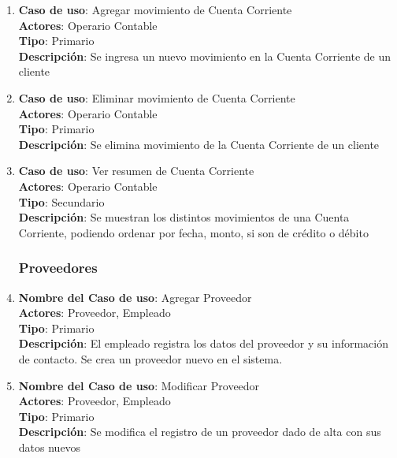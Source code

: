 \documentclass[12pt]{extarticle}
\begin{document}
\begin{spacing}{1.2}
\begin{enumerate}
            \item 	\textbf{Caso de uso}: Agregar movimiento de Cuenta Corriente\\
                    \textbf{Actores}: Operario Contable\\
                    \textbf{Tipo}: Primario\\
                    \textbf{Descripción}: Se ingresa un nuevo movimiento en la Cuenta Corriente de un cliente

            \item   \textbf{Caso de uso}: Eliminar movimiento de Cuenta Corriente\\
                    \textbf{Actores}: Operario Contable\\
                    \textbf{Tipo}: Primario\\
                    \textbf{Descripción}: Se elimina movimiento de la Cuenta Corriente de un cliente

            \item   \textbf{Caso de uso}: Ver resumen de Cuenta Corriente\\
                    \textbf{Actores}: Operario Contable\\
                    \textbf{Tipo}: Secundario\\
                    \textbf{Descripción}: Se muestran los distintos movimientos de una Cuenta Corriente, podiendo ordenar por fecha, monto, si son de crédito o débito



            \subsubsection{Proveedores}



            \item 	\textbf{Nombre del Caso de uso}: Agregar Proveedor\\
                    \textbf{Actores}: Proveedor, Empleado\\
                    \textbf{Tipo}: Primario\\
                    \textbf{Descripción}: El empleado registra los datos del proveedor y su información de contacto. Se crea un proveedor nuevo en el sistema.
            
            \item 	\textbf{Nombre del Caso de uso}: Modificar Proveedor\\
                    \textbf{Actores}: Proveedor, Empleado\\
                    \textbf{Tipo}: Primario\\
                    \textbf{Descripción}: Se modifica el registro de un proveedor dado de alta con sus datos nuevos
            

\end{enumerate}
\end{spacing}
\end{document}
